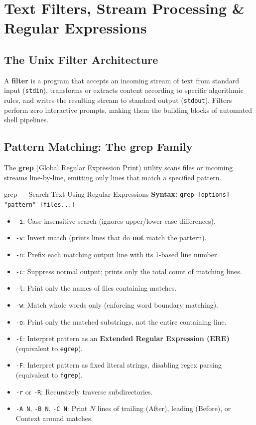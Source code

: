 \chapter{Text Filters, Stream Processing \& Regular Expressions}
\label{chap:filters-regex}

\section{The Unix Filter Architecture}
A \textbf{filter} is a program that accepts an incoming stream of text from standard input (\texttt{stdin}), transforms or extracts content according to specific algorithmic rules, and writes the resulting stream to standard output (\texttt{stdout}). Filters perform zero interactive prompts, making them the building blocks of automated shell pipelines.

\section{Pattern Matching: The grep Family}
The \textbf{grep} (Global Regular Expression Print) utility scans files or incoming streams line-by-line, emitting only lines that match a specified pattern.

\begin{commandbox}{grep --- Search Text Using Regular Expressions}
\textbf{Syntax:} \texttt{grep [options] "pattern" [files...]}
\begin{itemize}[leftmargin=1.5em]
    \item \texttt{-i}: Case-insensitive search (ignores upper/lower case differences).
    \item \texttt{-v}: Invert match (prints lines that do \textbf{not} match the pattern).
    \item \texttt{-n}: Prefix each matching output line with its 1-based line number.
    \item \texttt{-c}: Suppress normal output; prints only the total count of matching lines.
    \item \texttt{-l}: Print only the names of files containing matches.
    \item \texttt{-w}: Match whole words only (enforcing word boundary matching).
    \item \texttt{-o}: Print only the matched substrings, not the entire containing line.
    \item \texttt{-E}: Interpret pattern as an \textbf{Extended Regular Expression (ERE)} (equivalent to \texttt{egrep}).
    \item \texttt{-F}: Interpret pattern as fixed literal strings, disabling regex parsing (equivalent to \texttt{fgrep}).
    \item \texttt{-r} or \texttt{-R}: Recursively traverse subdirectories.
    \item \texttt{-A N}, \texttt{-B N}, \texttt{-C N}: Print $N$ lines of trailing (After), leading (Before), or Context around matches.
\end{itemize}
\end{commandbox}

